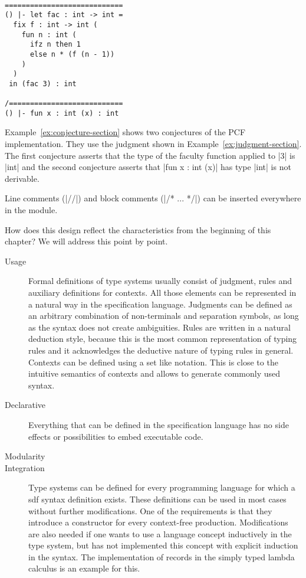 \begin{example}{~}
\begin{lstlisting}[language=sltc]
============================
() |- let fac : int -> int = 
  fix f : int -> int (
    fun n : int (
      ifz n then 1 
      else n * (f (n - 1))
    )
  )
 in (fac 3) : int

/===========================
() |- fun x : int (x) : int
\end{lstlisting}
\label{ex:conjecture-section}
\end{example}

Example~\ref{ex:conjecture-section} shows two conjectures of the PCF
implementation. They use the judgment shown in
Example~\ref{ex:judgment-section}. The first conjecture asserts that
the type of the faculty function applied to \code|3| is \code|int| and
the second conjecture asserts that \code|fun x : int (x)| has type
\code|int| is not derivable.

Line comments (\code|//|) and block comments (\code|/* ... */|) can be
inserted everywhere in the module.

How does this design reflect the characteristics from the beginning of
this chapter? We will address this point by point.

\begin{description}
\item[Usage] Formal definitions of type systems usually consist of
  judgment, rules and auxiliary definitions for contexts. All those
  elements can be represented in a natural way in the specification
  language. Judgments can be defined as an arbitrary combination of
  non-terminals and separation symbols, as long as the syntax does not
  create ambiguities. Rules are written in a natural deduction style,
  because this is the most common representation of typing rules and
  it acknowledges the deductive nature of typing rules in
  general. Contexts can be defined using a set like notation. This is
  close to the intuitive semantics of contexts and allows to generate
  commonly used syntax.
\item[Declarative] Everything that can be defined in the specification
  language has no side effects or possibilities to embed executable
  code.
\item[Modularity] 
\item[Integration] Type systems can be defined for every programming
  language for which a \gls{sdf} syntax definition exists. These
  definitions can be used in most cases without further
  modifications. One of the requirements is that they introduce a
  constructor for every context-free production. Modifications are
  also needed if one wants to use a language concept inductively in
  the type system, but has not implemented this concept with explicit
  induction in the syntax. The implementation of records in the simply
  typed lambda calculus is an example for this. 
\end{description}
